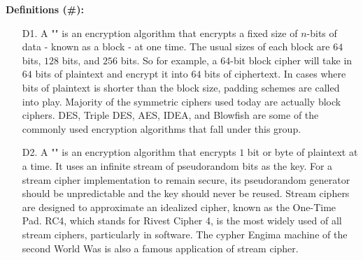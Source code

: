 		\textbf{Definitions (\#\mydef):}
		\begin{enumerate}
			\item[D1.] A "" is an encryption algorithm that encrypts a fixed size of $n$-bits of data - known as a block - at one time. The usual sizes of each block are $64$ bits, $128$ bits, and $256$ bits. So for example, a $64$-bit block cipher will take in $64$ bits of plaintext and encrypt it into $64$ bits of ciphertext. In cases where bits of plaintext is shorter than the block size, padding schemes are called into play. Majority of the symmetric ciphers used today are actually block ciphers. DES, Triple DES, AES, IDEA, and Blowfish are some of the commonly used encryption algorithms that fall under this group.  
	
				\item[D2.] A "" is an encryption algorithm that encrypts $1$ bit or byte of plaintext at a time. It uses an infinite stream of pseudorandom bits as the key. For a stream cipher implementation to remain secure, its pseudorandom generator should be unpredictable and the key should never be reused. Stream ciphers are designed to approximate an idealized cipher, known as the One-Time Pad. RC4, which stands for Rivest Cipher 4, is the most widely used of all stream ciphers, particularly in software. The cypher Engima machine of the second World Was is also a famous application of stream cipher.
		\end{enumerate}
		
